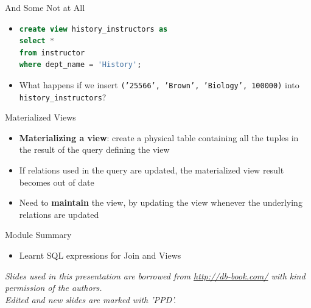 \documentclass[aspectratio=169, xcolor=dvipsnames]{beamer}
\begin{document}
\begin{frame}[fragile]{And Some Not at All}
    \begin{itemize}
        \item \begin{lstlisting}[language=SQL]
create view history_instructors as 
select * 
from instructor 
where dept_name = 'History';
        \end{lstlisting}
        \item What happens if we insert \texttt{('25566', 'Brown', 'Biology', 100000)} into \texttt{history\_instructors}?
    \end{itemize}
\end{frame}

\begin{frame}{Materialized Views}
    \begin{itemize}
        \item \textbf{Materializing a view}: create a physical table containing all the tuples in the result of the query defining the view
        \item If relations used in the query are updated, the materialized view result becomes out of date
        \item Need to \textbf{maintain} the view, by updating the view whenever the underlying relations are updated
    \end{itemize}
\end{frame}

\begin{frame}{Module Summary}
    \begin{itemize}
        \item Learnt SQL expressions for Join and Views
    \end{itemize}
    \vspace{2em}
    \begin{center}
    \small \textit{Slides used in this presentation are borrowed from \url{http://db-book.com/} with kind permission of the authors.} \\
    \small \textit{Edited and new slides are marked with 'PPD'.}
    \end{center}
\end{frame}
\end{document}
